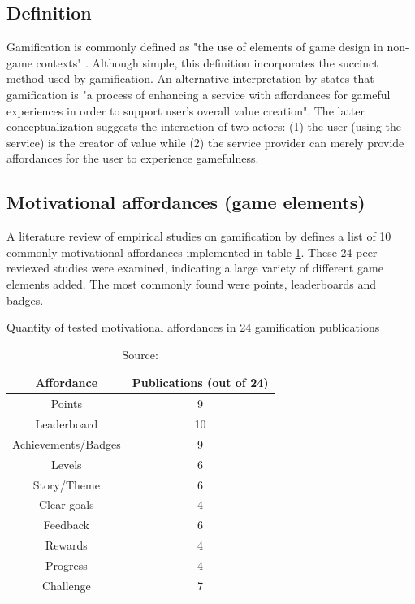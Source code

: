 \subsection{Definition}

Gamification is commonly defined as "the use of elements of game design in non-game contexts" \cite{deterding2011game}. Although simple, this definition incorporates the succinct method used by gamification. An alternative interpretation by \cite{huotari2012defining} states that gamification is "a process of enhancing a service with affordances for gameful experiences in order to support user's overall value creation". The latter conceptualization suggests the interaction of two actors: (1) the user (using the service) is the creator of value while (2) the service provider can merely provide affordances for the user to experience gamefulness.

\subsection{Motivational affordances (game elements)}

A literature review of empirical studies on gamification by \cite{hamari2014does} defines a list of 10 commonly motivational affordances implemented in table \ref{tab:motivational-affordances}. These 24 peer-reviewed studies were examined, indicating a large variety of different game elements added. The most commonly found were points, leaderboards and badges.

\begin{table}[h]
    \centering
    \caption{Quantity of tested motivational affordances in 24 gamification publications}
    \begin{tabular}{|c|c|}
        \hline Affordance & Publications (out of 24) \\
        \hline Points & 9 \\
        \hline Leaderboard & 10\\ 
        \hline Achievements/Badges & 9 \\
        \hline Levels & 6 \\
        \hline Story/Theme & 6 \\
        \hline Clear goals & 4 \\
        \hline Feedback & 6 \\
        \hline Rewards & 4 \\
        \hline Progress & 4 \\
        \hline Challenge & 7 \\
        \hline
    \end{tabular}
    \caption*{Source: \cite{hamari2014does}}
    \label{tab:motivational-affordances}
\end{table}

